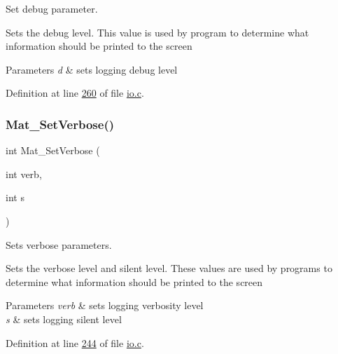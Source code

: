 Set debug parameter. 

Sets the debug level. This value is used by program to determine what information should be printed to the screen


\begin{DoxyParams}{Parameters}
{\em d} & sets logging debug level \\
\hline
\end{DoxyParams}


Definition at line \hyperlink{io_8c_source_l00260}{260} of file \hyperlink{io_8c_source}{io.\+c}.

\mbox{\label{group__mat__util_gaf348b811ee26bfc923924878cea3c9ba}} 
\subsubsection{\texorpdfstring{Mat\+\_\+\+Set\+Verbose()}{Mat\_SetVerbose()}}
{\footnotesize\ttfamily int Mat\+\_\+\+Set\+Verbose (\begin{DoxyParamCaption}\item[{int}]{verb,  }\item[{int}]{s }\end{DoxyParamCaption})}



Sets verbose parameters. 

Sets the verbose level and silent level. These values are used by programs to determine what information should be printed to the screen


\begin{DoxyParams}{Parameters}
{\em verb} & sets logging verbosity level \\
\hline
{\em s} & sets logging silent level \\
\hline
\end{DoxyParams}


Definition at line \hyperlink{io_8c_source_l00244}{244} of file \hyperlink{io_8c_source}{io.\+c}.

\mbox{\label{group__mat__util_gab6774aabdc124c540c1e7686d0804940}} 
